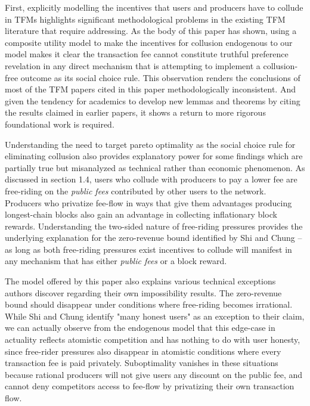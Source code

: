 \documentclass[oneside]{article}   	%
\begin{document}
First, explicitly modelling the incentives that users and producers have to collude in TFMs highlights significant methodological problems in the existing TFM literature that require addressing. As the body of this paper has shown, using a composite utility model to make the incentives for collusion endogenous to our model makes it clear the transaction fee cannot constitute truthful preference revelation in any direct mechanism that is attempting to implement a collusion-free outcome as its social choice rule. This observation renders the conclusions of most of the TFM papers cited in this paper methodologically inconsistent. And given the tendency for academics to develop new lemmas and theorems by citing the results claimed in earlier papers, it shows a return to more rigorous foundational work is required.

Understanding the need to target pareto optimality as the social choice rule for eliminating collusion also provides explanatory power for some findings which are partially true but misanalyzed as technical rather than economic phenomenon. As discussed in section 1.4, users who collude with producers to pay a lower fee are free-riding on the \textit{public fees} contributed by other users to the network. Producers who privatize fee-flow in ways that give them advantages producing longest-chain blocks also gain an advantage in collecting inflationary block rewards. Understanding the two-sided nature of free-riding pressures provides the underlying explanation for the zero-revenue bound identified by Shi and Chung -- as long as both free-riding pressures exist incentives to collude will manifest in any mechanism that has either \textit{public fees} or a block reward.

The model offered by this paper also explains various technical exceptions authors discover regarding their own impossibility results. The zero-revenue bound should disappear under conditions where free-riding becomes irrational. While Shi and Chung identify "many honest users" as an exception to their claim, we can actually observe from the endogenous model that this edge-case in actuality reflects atomistic competition and has nothing to do with user honesty, since free-rider pressures also disappear in atomistic conditions where every transaction fee is paid privately. Suboptimality vanishes in these situations because rational producers will not give users any discount on the public fee, and cannot deny competitors access to fee-flow by privatizing their own transaction flow.
\end{document}
